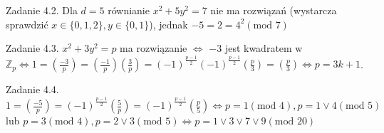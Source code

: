 \documentclass{article}
\begin{document}
Zadanie 4.2.
\newline
\newline
Dla $d=5$ równianie $x^2+5y^2=7$ nie ma rozwiązań (wystarcza sprawdzić $x\in\{0,1,2\},y\in\{0,1\}$), jednak $-5=2=4^2(\text{mod }7)$
\newline

Zadanie 4.3.
\newline
\newline
$x^2+3y^2=p$ ma rozwiązanie $\Leftrightarrow$ $-3$ jest kwadratem w $\mathbb{Z}_p\Leftrightarrow 1=(\frac{-3}{p})=(\frac{-1}{p})(\frac{3}{p})=
(-1)^{\frac{p-1}{2}}(-1)^{\frac{p-1}{2}}(\frac{p}{3})=(\frac{p}{3})\Leftrightarrow p=3k+1$.
\newline

Zadanie 4.4.
\newline
\newline
$1=(\frac{-5}{p})=(-1)^{\frac{p-1}{2}}(\frac{5}{p})=(-1)^{\frac{p-1}{2}}(\frac{p}{5})\Leftrightarrow p=1(\text{mod }4),p=1\vee4(\text{mod }5)$ lub $p=3(\text{mod }4),p=2\vee3(\text{mod }5)
\Leftrightarrow p=1\vee3\vee7\vee9(\text{mod }20)$
\end{document}
